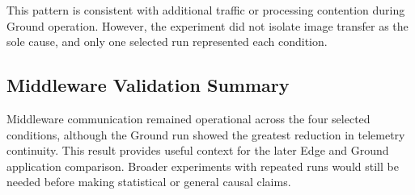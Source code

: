 This pattern is consistent with additional traffic or processing contention during Ground operation. However, the experiment did not isolate image transfer as the sole cause, and only one selected run represented each condition.

\subsection{Middleware Validation Summary}

Middleware communication remained operational across the four selected conditions, although the Ground run showed the greatest reduction in telemetry continuity. This result provides useful context for the later Edge and Ground application comparison. Broader experiments with repeated runs would still be needed before making statistical or general causal claims.
